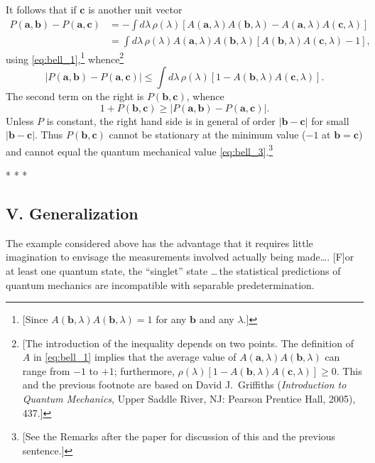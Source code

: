 It follows that if $\pmb{c}$ is another unit vector
\begin{align*}
P(\pmb{a}, \pmb{b}) - P(\pmb{a}, \pmb{c}) &= - \int d\lambda\, \rho(\lambda) [A(\pmb{a}, \lambda) A(\pmb{b}, \lambda) - A(\pmb{a}, \lambda) A(\pmb{c}, \lambda)] \\
 &= \int d\lambda\, \rho(\lambda) A(\pmb{a}, \lambda) A(\pmb{b}, \lambda) [A(\pmb{b}, \lambda) A(\pmb{c}, \lambda)-1],
\end{align*}
using \eqref{eq:bell_1},\footnote{[Since $A(\pmb{b},\lambda)A(\pmb{b},\lambda)=1$ for any $\pmb{b}$ and any $\lambda$.]} whence\footnote{[The introduction of the inequality depends on two points. The definition of $A$ in \eqref{eq:bell_1} implies that the average value of $A(\pmb{a}, \lambda) A(\pmb{b}, \lambda)$ can range from $-1$ to $+1$; furthermore, $\rho(\lambda)[1 - A(\pmb{b}, \lambda) A(\pmb{c}, \lambda)] \geq 0$. This and the previous footnote are based on David J.\ Griffiths (\emph{Introduction to Quantum Mechanics}, Upper Saddle River, NJ: Pearson Prentice Hall, 2005), 437.]}
\begin{equation*}
|P(\pmb{a}, \pmb{b}) - P(\pmb{a}, \pmb{c})| \leq \int d\lambda\, \rho(\lambda) [1 - A(\pmb{b}, \lambda) A(\pmb{c}, \lambda)].
\end{equation*}
The second term on the right is $P(\pmb{b}, \pmb{c})$, whence
\begin{equation}
1 + P(\pmb{b}, \pmb{c}) \geq |P(\pmb{a}, \pmb{b}) - P(\pmb{a}, \pmb{c})|.
\end{equation}
Unless $P$ is constant, the right hand side is in general of order $|\pmb{b}-\pmb{c}|$ for small $|\pmb{b}-\pmb{c}|$. Thus $P(\pmb{b}, \pmb{c})$
cannot be stationary at the minimum value ($-1$ at $\pmb{b} = \pmb{c}$) and cannot 
equal the quantum mechanical value \eqref{eq:bell_3}.\footnote{[See the Remarks after the paper for discussion of this and the previous sentence.]}\\
\centerline{* * *}

\subsection*{V. Generalization}
The example considered above has the advantage that it requires little imagination to envisage the
measurements involved actually being made\ldots. [F]or at least one quantum state, the ``singlet'' state \ldots\,the 
statistical predictions of quantum mechanics are incompatible with separable predetermination.

